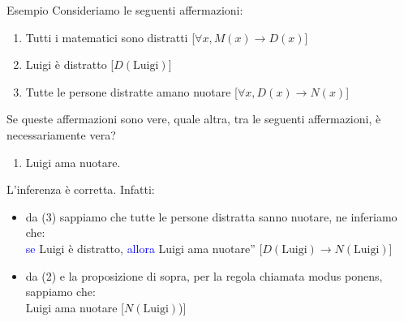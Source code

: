 \documentclass[aspectratio=169,10pt]{beamer}
\newcommand{\conn}[1]{\textcolor{blue}{#1}}
\begin{document}
\begin{frame}{Esempio}
 Consideriamo le seguenti affermazioni:
 \begin{enumerate}
\item Tutti i matematici sono distratti [\alert{$\forall x, M(x) \to D(x)$}]
\item Luigi è distratto [\alert{$D(\text{Luigi})$}]
\item Tutte le persone distratte amano nuotare [\alert{$\forall x, D(x) \to N(x)$}]
\end{enumerate}
Se queste affermazioni sono vere, quale altra, tra le seguenti affermazioni, è necessariamente vera?
\begin{enumerate}[A]\addtocounter{enumi}{3}
\item Luigi ama nuotare.  
\end{enumerate}
\pause
\medskip
L'inferenza è corretta. Infatti:
\begin{itemize}
\item da (3) sappiamo che tutte le persone distratta sanno nuotare, ne inferiamo che:\\
\hspace{1cm}\conn{se} Luigi è distratto, \conn{allora} Luigi ama nuotare'' [\alert{$D(\text{Luigi}) \to N(\text{Luigi})$}]
\item da (2) e la proposizione di sopra, per la regola chiamata \alert{modus ponens}, sappiamo che:\\
\hspace{1cm}Luigi ama nuotare [\alert{$N(\text{Luigi})$)}]
\end{itemize}
\end{frame}
\end{document}

